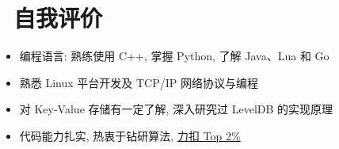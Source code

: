 \documentclass{resume}
\begin{document}
\section{\faInfo\ 自我评价}
\begin{itemize}[parsep=0.5ex]
  \item 编程语言: 熟练使用 C++, 掌握 Python, 了解 Java、Lua 和 Go
  \item 熟悉 Linux 平台开发及 TCP/IP 网络协议与编程
  \item 对 Key-Value 存储有一定了解, 深入研究过 LevelDB 的实现原理
  \item 代码能力扎实, 热衷于钻研算法, \href{https://leetcode.cn/u/keshuigu/}{力扣 Top 2\%}
\end{itemize}

%
%
\end{document}
